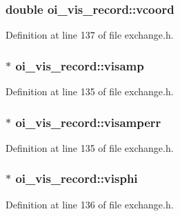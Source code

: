 \hypertarget{structoi__vis__record_a366af261ccf051d13ca3cda1c672380b}{
\subsubsection[{vcoord}]{\setlength{\rightskip}{0pt plus 5cm}double {\bf oi\_\-vis\_\-record::vcoord}}}
\label{structoi__vis__record_a366af261ccf051d13ca3cda1c672380b}


Definition at line 137 of file exchange.h.

\hypertarget{structoi__vis__record_a2f3ddb296968ff027355685dac5b190f}{
\subsubsection[{visamp}]{$\ast$ {\bf oi\_\-vis\_\-record::visamp}}}
\label{structoi__vis__record_a2f3ddb296968ff027355685dac5b190f}


Definition at line 135 of file exchange.h.

\hypertarget{structoi__vis__record_a81c1ae4af3bdbb9c3733966b6cbc0d1f}{
\subsubsection[{visamperr}]{ $\ast$ {\bf oi\_\-vis\_\-record::visamperr}}}
\label{structoi__vis__record_a81c1ae4af3bdbb9c3733966b6cbc0d1f}


Definition at line 135 of file exchange.h.

\hypertarget{structoi__vis__record_ad41751320cdb31c9f491da4897378079}{
\subsubsection[{visphi}]{$\ast$ {\bf oi\_\-vis\_\-record::visphi}}}
\label{structoi__vis__record_ad41751320cdb31c9f491da4897378079}


Definition at line 136 of file exchange.h.

